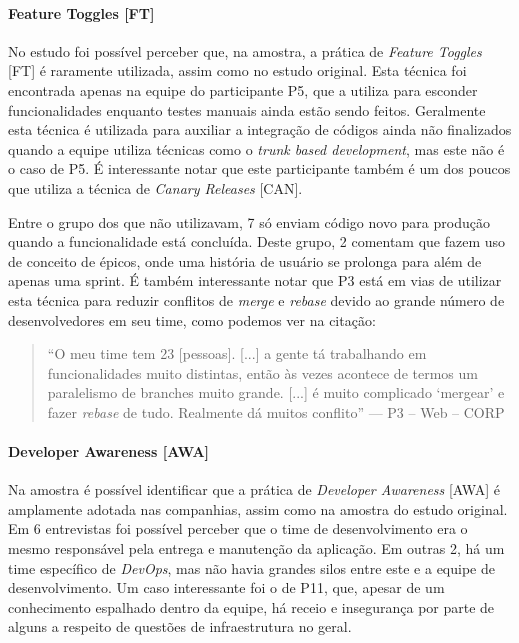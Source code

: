 \paragraph{Feature Toggles [FT]}

No estudo foi possível perceber que, na amostra, a prática de \emph{Feature Toggles} [FT] \cite{featureToggles} é raramente utilizada, assim como no estudo original. Esta técnica foi encontrada apenas na equipe do participante P5, que a utiliza para esconder funcionalidades enquanto testes manuais ainda estão sendo feitos. Geralmente esta técnica é utilizada para auxiliar a integração de códigos ainda não finalizados quando a equipe utiliza técnicas como o \emph{trunk based development}, mas este não é o caso de P5. É interessante notar que este participante também é um dos poucos que utiliza a técnica de \emph{Canary Releases} [CAN].

Entre o grupo dos que não utilizavam, 7 só enviam código novo para produção quando a funcionalidade está concluída. Deste grupo, 2 comentam que fazem uso de conceito de épicos, onde uma história de usuário se prolonga para além de apenas uma sprint. É também interessante notar que P3 está em vias de utilizar esta técnica para reduzir conflitos de \emph{merge} e \emph{rebase} devido ao grande número de desenvolvedores em seu time, como podemos ver na citação:


\begin{quote}
    ``O meu time tem 23 [pessoas]. [...] a gente tá trabalhando em funcionalidades muito distintas, então às vezes acontece de termos um paralelismo de branches muito grande. [...] é muito complicado `mergear' e fazer \emph{rebase} de tudo. Realmente dá muitos conflito'' --- P3 -- Web -- CORP
\end{quote}


\paragraph{Developer Awareness [AWA]}

Na amostra é possível identificar que a prática de \emph{Developer Awareness} [AWA] é amplamente adotada nas companhias, assim como na amostra do estudo original. Em 6 entrevistas foi possível perceber que o time de desenvolvimento era o mesmo responsável pela entrega e manutenção da aplicação. Em outras 2, há um time específico de \emph{DevOps}, mas não havia grandes silos entre este e a equipe de desenvolvimento. Um caso interessante foi o de P11, que, apesar de um conhecimento espalhado dentro da equipe, há receio e insegurança por parte de alguns a respeito de questões de infraestrutura no geral.


